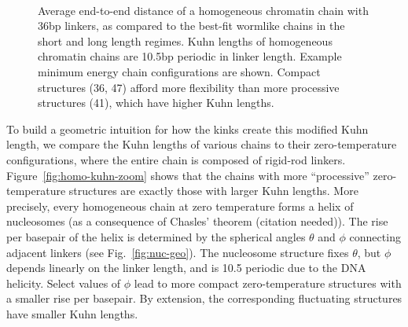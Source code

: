 \documentclass[%
 reprint,
superscriptaddress,
showpacs,preprintnumbers,
 amsmath,amssymb,
 aps,
 prl,
]{revtex4-1}
\begin{document}
\begin{figure}[ht]
    \\
    \caption{\protect{} Average end-to-end distance of a
    homogeneous chromatin chain with 36bp linkers, as compared to the best-fit
    wormlike chains in the short and long length regimes.
    \protect{} Kuhn lengths of homogeneous chromatin
    chains are 10.5bp periodic in linker length. Example minimum energy chain
    configurations are shown. Compact structures (36, \SI{47}{\basepair}) afford
    more flexibility than more processive structures (\SI{41}{\basepair}), which
    have higher Kuhn lengths.}\label{fig:homo-chain}
\end{figure}

To build a geometric intuition for how the kinks create this modified Kuhn
    length, we compare the Kuhn lengths of various chains to their
    zero-temperature configurations, where the entire chain is composed of
    rigid-rod linkers.
Figure~\ref{fig:homo-kuhn-zoom} shows that the chains with more ``processive''
    zero-temperature structures are exactly those with larger Kuhn lengths.
More precisely, every homogeneous chain at zero temperature forms a
    helix of nucleosomes (as a consequence of Chasles' theorem (citation needed)).
The rise per basepair of the helix is determined by the spherical angles
    $\theta$ and $\phi$ connecting adjacent linkers (see Fig.~\ref{fig:nuc-geo}).
The nucleosome structure fixes $\theta$, but $\phi$ depends linearly on the
    linker length, and is \SI{10.5}{\basepair} periodic due to the DNA helicity.
Select values of $\phi$ lead to more compact zero-temperature structures with a
    smaller rise per basepair.
By extension, the corresponding fluctuating structures have smaller Kuhn lengths.
\end{document}
